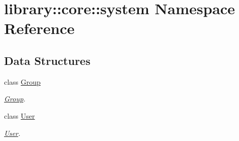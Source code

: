\hypertarget{namespacelibrary_1_1core_1_1system}{}\section{library\+:\+:core\+:\+:system Namespace Reference}
\label{namespacelibrary_1_1core_1_1system}
\subsection*{Data Structures}
\begin{DoxyCompactItemize}
\item 
class \hyperlink{classlibrary_1_1core_1_1system_1_1Group}{Group}
\begin{DoxyCompactList}\small\item\em \hyperlink{classlibrary_1_1core_1_1system_1_1Group}{Group}. \end{DoxyCompactList}\item 
class \hyperlink{classlibrary_1_1core_1_1system_1_1User}{User}
\begin{DoxyCompactList}\small\item\em \hyperlink{classlibrary_1_1core_1_1system_1_1User}{User}. \end{DoxyCompactList}\end{DoxyCompactItemize}
